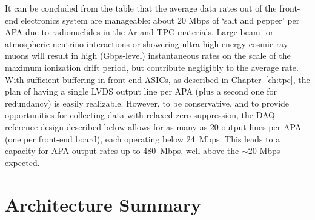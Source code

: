 It can be concluded from the table that the average data rates out of the 
front-end electronics system are manageable: 
about 20 Mbps of `salt and pepper' per APA 
due to radionuclides in the Ar and TPC materials. 
Large beam- or atmospheric-neutrino interactions or 
showering ultra-high-energy cosmic-ray muons will result in high (Gbps-level)
instantaneous rates on the scale of the maximum ionization drift period, 
but contribute negligibly to the average rate.
With sufficient buffering in front-end ASICs, as described 
in Chapter~\ref{ch:tpc}, the plan of having a single LVDS output line per APA 
(plus a second one for redundancy) is easily realizable.  However, 
to be conservative, and to provide opportunities for collecting data with 
relaxed zero-suppression, the DAQ reference design described below 
allows for as many as 20 output lines per APA (one per front-end board), 
each operating below 24~Mbps.  This leads to a capacity for APA output 
rates up to 480~Mbps, well above the $\sim 20$ Mbps expected. 




\section{Architecture Summary}
\label{sec:v5-trig-daq}

